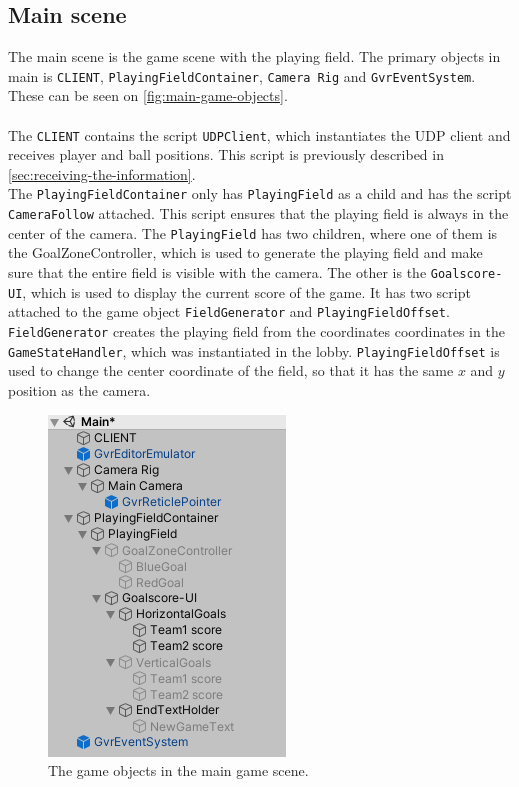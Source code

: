 \subsection{Main scene}
The main scene is the game scene with the playing field.
The primary objects in main is \texttt{CLIENT}, \texttt{PlayingFieldContainer}, \texttt{Camera Rig} and \texttt{GvrEventSystem}.
These can be seen on \autoref{fig:main-game-objects}.
\\\\
The \texttt{CLIENT} contains the script \texttt{UDPClient}, which instantiates the UDP client and receives player and ball positions.
This script is previously described in \autoref{sec:receiving-the-information}.
\\
The \texttt{PlayingFieldContainer} only has \texttt{PlayingField} as a child and has the script \texttt{CameraFollow} attached.
This script ensures that the playing field is always in the center of the camera.
The \texttt{PlayingField} has two children, where one of them is the GoalZoneController, which is used to generate the playing field and make sure that the entire field is visible with the camera.
The other is the \texttt{Goalscore-UI}, which is used to display the current score of the game.
It has two script attached to the game object \texttt{FieldGenerator} and \texttt{PlayingFieldOffset}.
\texttt{FieldGenerator} creates the playing field from the coordinates coordinates in the \texttt{GameStateHandler}, which was instantiated in the lobby.
\texttt{PlayingFieldOffset} is used to change the center coordinate of the field, so that it has the same $x$ and $y$ position as the camera.

\begin{figure}[H]
    \centering
    \includegraphics[width=0.4\linewidth]{figures/unity-main-gameobjects.PNG}
    \caption{The game objects in the main game scene.}
    \label{fig:main-game-objects}
\end{figure}


